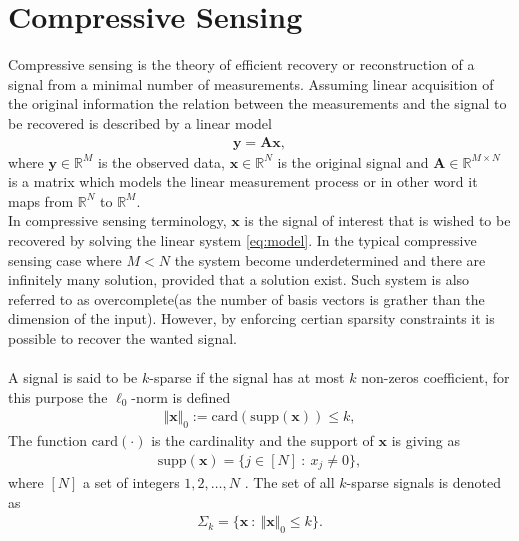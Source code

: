 \section{Compressive Sensing}\label{sec:CS}
Compressive sensing is the theory of efficient recovery or reconstruction of a signal from a minimal number of measurements. Assuming linear acquisition of the original information the relation between the measurements and the signal to be recovered is described by a linear model\cite{FR} 
\begin{align}\label{eq:model}
\mathbf{y} = \mathbf{Ax},
\end{align}
where $\mathbf{y} \in \mathbb{R}^M$ is the observed data, $\mathbf{x} \in \mathbb{R}^N$ is the original signal and $\mathbf{A} \in \mathbb{R}^{M \times N}$ is a matrix which models the linear measurement process or in other word it maps from $\mathbb{R}^{N}$ to $\mathbb{R}^{M}$.\\
In compressive sensing terminology, $\mathbf{x}$ is the signal of interest that is wished to be recovered by solving the linear system \eqref{eq:model}. In the typical compressive sensing case where $M<N$ the system become underdetermined and there are infinitely many solution, provided that a solution exist. Such system is also referred to as overcomplete(as the number of basis vectors is grather than the dimension of the input). However, by enforcing certian sparsity constraints it is possible to recover the wanted signal\cite{FR}.   
\\ \\
A signal is said to be $k$-sparse if the signal has at most $k$ non-zeros coefficient, for this purpose the $\ell_0$-norm is defined 
\begin{align*}
\Vert \mathbf{x} \Vert_0 := \text{card}(\text{supp}(\mathbf{x})) \leq k,
\end{align*}
The function $\text{card}(\cdot)$ is the cardinality and the support of $\mathbf{x}$ is giving as
\begin{align*}
\text{supp}(\mathbf{x}) = \{ j \in [N] \ : \ x_j \neq 0 \},
\end{align*} 
where $[N]$ a set of integers ${1,2,\hdots,N}$ \cite[p. 41]{FR}. The set of all $k$-sparse signals is denoted as
\begin{align*}
\Sigma_k = \{ \mathbf{x} \ : \ \Vert \mathbf{x} \Vert_0 \leq k \}.
\end{align*}

